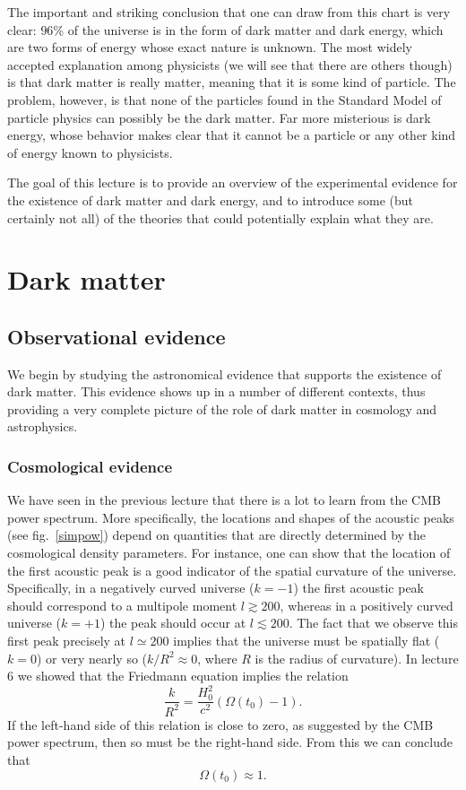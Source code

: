 \documentclass[11pt, a4paper,oneside,openright]{book}
\numberwithin{equation}{section}
\begin{document}
The important and striking conclusion that one can draw from this chart is very clear: $96\%$ of the universe is in the form of dark matter and dark energy, which are two forms of energy whose exact nature is unknown. The most widely accepted explanation among physicists (we will see that there are others though) is that dark matter is really matter, meaning that it is some kind of particle. The problem, however, is that none of the particles found in the Standard Model of particle physics can possibly be the dark matter. Far more misterious is dark energy, whose behavior makes clear that it cannot be a particle or any other kind of energy known to physicists.

The goal of this lecture is to provide an overview of the experimental evidence for the existence of dark matter and dark energy, and to introduce some (but certainly not all) of the theories that could potentially explain what they are.

\section{Dark matter}

\subsection{Observational evidence}

We begin by studying the astronomical evidence that supports the existence of dark matter. This evidence shows up in a number of different contexts, thus providing a very complete picture of the role of dark matter in cosmology and astrophysics.

\subsubsection{Cosmological evidence}

We have seen in the previous lecture that there is a lot to learn from the CMB power spectrum. More specifically, the locations and shapes of the acoustic peaks (see fig.\ \ref{simpow}) depend on quantities that are directly determined by the cosmological density parameters. For instance, one can show that the location of the first acoustic peak is a good indicator of the spatial curvature of the universe. Specifically, in a negatively curved universe ($k=-1$) the first acoustic peak should correspond to a multipole moment $l\gtrsim200$, whereas in a positively curved universe ($k=+1$) the peak should occur at $l\lesssim200$. The fact that we observe this first peak precisely at $l\simeq200$ implies that the universe must be spatially flat ($k=0$) or very nearly so ($k/R^2\approx0$, where $R$ is the radius of curvature). In lecture 6 we showed that the Friedmann equation implies the relation
\begin{equation}
\frac{k}{R^2}=\frac{H_0^2}{c^2}\left(\Omega(t_0)-1\right).
\end{equation}
If the left-hand side of this relation is close to zero, as suggested by the CMB power spectrum, then so must be the right-hand side. From this we can conclude that
\begin{equation}
\Omega(t_0)\approx 1.
\end{equation}
\end{document}
